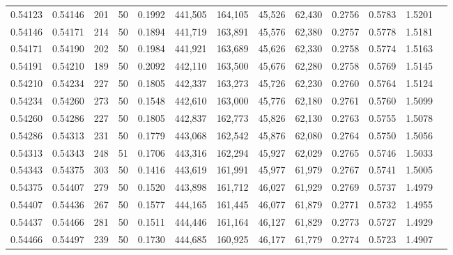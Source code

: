 \begin{tabular}{rrrrrrrrrrrrr}
0.54123 & 0.54146 &   201 &  50 &                                     0.1992 & 441,505 & 164,105 &  45,526 &  62,430 & 0.2756 & 0.5783 & 1.5201 \\
0.54146 & 0.54171 &   214 &  50 &                                     0.1894 & 441,719 & 163,891 &  45,576 &  62,380 & 0.2757 & 0.5778 & 1.5181 \\
0.54171 & 0.54190 &   202 &  50 &                                     0.1984 & 441,921 & 163,689 &  45,626 &  62,330 & 0.2758 & 0.5774 & 1.5163 \\
0.54191 & 0.54210 &   189 &  50 &                                     0.2092 & 442,110 & 163,500 &  45,676 &  62,280 & 0.2758 & 0.5769 & 1.5145 \\
0.54210 & 0.54234 &   227 &  50 &                                     0.1805 & 442,337 & 163,273 &  45,726 &  62,230 & 0.2760 & 0.5764 & 1.5124 \\
0.54234 & 0.54260 &   273 &  50 &                                     0.1548 & 442,610 & 163,000 &  45,776 &  62,180 & 0.2761 & 0.5760 & 1.5099 \\
0.54260 & 0.54286 &   227 &  50 &                                     0.1805 & 442,837 & 162,773 &  45,826 &  62,130 & 0.2763 & 0.5755 & 1.5078 \\
0.54286 & 0.54313 &   231 &  50 &                                     0.1779 & 443,068 & 162,542 &  45,876 &  62,080 & 0.2764 & 0.5750 & 1.5056 \\
0.54313 & 0.54343 &   248 &  51 &                                     0.1706 & 443,316 & 162,294 &  45,927 &  62,029 & 0.2765 & 0.5746 & 1.5033 \\
0.54343 & 0.54375 &   303 &  50 &                                     0.1416 & 443,619 & 161,991 &  45,977 &  61,979 & 0.2767 & 0.5741 & 1.5005 \\
0.54375 & 0.54407 &   279 &  50 &                                     0.1520 & 443,898 & 161,712 &  46,027 &  61,929 & 0.2769 & 0.5737 & 1.4979 \\
0.54407 & 0.54436 &   267 &  50 &                                     0.1577 & 444,165 & 161,445 &  46,077 &  61,879 & 0.2771 & 0.5732 & 1.4955 \\
0.54437 & 0.54466 &   281 &  50 &                                     0.1511 & 444,446 & 161,164 &  46,127 &  61,829 & 0.2773 & 0.5727 & 1.4929 \\
0.54466 & 0.54497 &   239 &  50 &                                     0.1730 & 444,685 & 160,925 &  46,177 &  61,779 & 0.2774 & 0.5723 & 1.4907 \\

\end{tabular}
